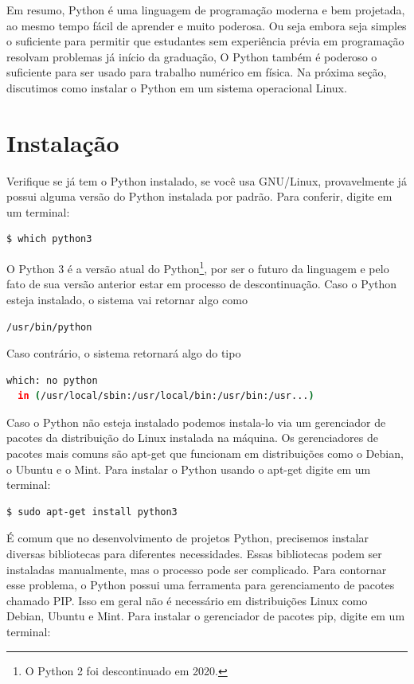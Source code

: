 Em resumo, Python é uma linguagem de programação moderna e bem projetada, ao mesmo tempo fácil de aprender e muito poderosa. Ou seja embora seja simples o suficiente para permitir que estudantes sem experiência prévia em programação resolvam problemas já início da graduação, O Python também é poderoso o suficiente para ser usado para trabalho numérico em física. Na próxima seção, discutimos como instalar o Python em um sistema operacional Linux.

\section{Instalação}\label{sc:1.1}

Verifique se já tem o Python instalado, se você usa GNU/Linux, provavelmente já possui alguma versão do Python instalada por padrão. Para conferir, digite em um terminal:

\begin{lstlisting}[language=bash]
  $ which python3
\end{lstlisting}
O Python 3 é a versão atual do Python\footnote{O Python 2 foi descontinuado em 2020.}, por ser o futuro da linguagem e pelo fato de sua versão anterior estar em processo de descontinuação.
Caso o Python esteja instalado, o sistema vai retornar algo como
\begin{lstlisting}[language=bash]
  /usr/bin/python
\end{lstlisting}
Caso contrário, o sistema retornará algo do tipo
\begin{lstlisting}[language=bash]
  which: no python 
  in (/usr/local/sbin:/usr/local/bin:/usr/bin:/usr...)
\end{lstlisting}

Caso o Python não esteja instalado podemos instala-lo via um gerenciador de pacotes da distribuição do Linux instalada na máquina. Os gerenciadores de pacotes mais comuns são apt-get que funcionam em distribuições como o Debian, o Ubuntu e o Mint. Para instalar o Python usando o apt-get digite em um terminal:
\begin{lstlisting}[language=bash]
  $ sudo apt-get install python3
\end{lstlisting}
É comum que no desenvolvimento de projetos Python, precisemos instalar diversas bibliotecas para diferentes necessidades. Essas bibliotecas podem ser instaladas manualmente, mas o processo pode ser complicado. Para contornar esse problema, o Python possui uma ferramenta para gerenciamento de pacotes chamado PIP. Isso em geral não é necessário em distribuições Linux como Debian, Ubuntu e Mint. Para instalar o gerenciador de pacotes pip, digite em um terminal:

